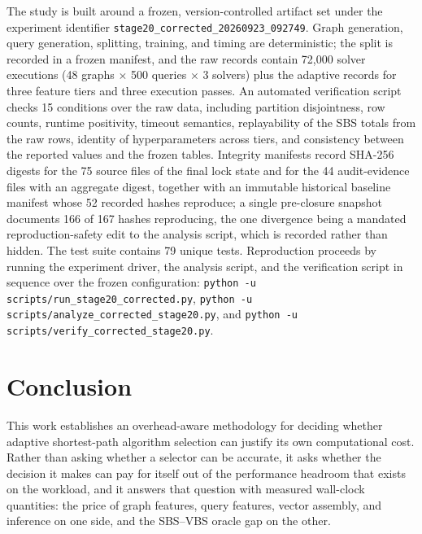 \documentclass[conference]{IEEEtran}
\begin{document}
The study is built around a frozen, version-controlled artifact set under the experiment identifier \texttt{stage20\_corrected\_20260923\_092749}. Graph generation, query generation, splitting, training, and timing are deterministic; the split is recorded in a frozen manifest, and the raw records contain 72,000 solver executions (48 graphs $\times$ 500 queries $\times$ 3 solvers) plus the adaptive records for three feature tiers and three execution passes. An automated verification script checks 15 conditions over the raw data, including partition disjointness, row counts, runtime positivity, timeout semantics, replayability of the SBS totals from the raw rows, identity of hyperparameters across tiers, and consistency between the reported values and the frozen tables. Integrity manifests record SHA-256 digests for the 75 source files of the final lock state and for the 44 audit-evidence files with an aggregate digest, together with an immutable historical baseline manifest whose 52 recorded hashes reproduce; a single pre-closure snapshot documents 166 of 167 hashes reproducing, the one divergence being a mandated reproduction-safety edit to the analysis script, which is recorded rather than hidden. The test suite contains 79 unique tests. Reproduction proceeds by running the experiment driver, the analysis script, and the verification script in sequence over the frozen configuration: \texttt{python -u scripts/run\_stage20\_}\allowbreak\texttt{corrected.py}, \texttt{python -u scripts/analyze\_corrected\_}\allowbreak\texttt{stage20.py}, and \texttt{python -u scripts/verify\_corrected\_}\allowbreak\texttt{stage20.py}.

\balance
\section{Conclusion}

This work establishes an overhead-aware methodology for deciding whether adaptive shortest-path algorithm selection can justify its own computational cost. Rather than asking whether a selector can be accurate, it asks whether the decision it makes can pay for itself out of the performance headroom that exists on the workload, and it answers that question with measured wall-clock quantities: the price of graph features, query features, vector assembly, and inference on one side, and the SBS--VBS oracle gap on the other.
\end{document}
